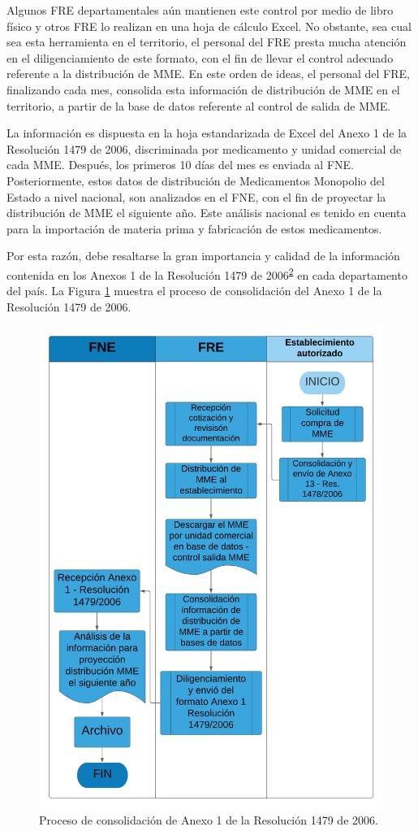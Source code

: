 \documentclass[
  oneside]{book}
\begin{document}
Algunos FRE departamentales aún mantienen este control por medio de libro físico y otros FRE lo realizan en una hoja de cálculo Excel. No obstante, sea cual sea esta herramienta en el territorio, el personal del FRE presta mucha atención en el diligenciamiento de este formato, con el fin de llevar el control adecuado referente a la distribución de MME. En este orden de ideas, el personal del FRE, finalizando cada mes, consolida esta información de distribución de MME en el territorio, a partir de la base de datos referente al control de salida de MME.

La información es dispuesta en la hoja estandarizada de Excel del Anexo 1 de la Resolución 1479 de 2006, discriminada por medicamento y unidad comercial de cada MME. Después, los primeros 10 días del mes es enviada al FNE. Posteriormente, estos datos de distribución de Medicamentos Monopolio del Estado a nivel nacional, son analizados en el FNE, con el fin de proyectar la distribución de MME el siguiente año. Este análisis nacional es tenido en cuenta para la importación de materia prima y fabricación de estos medicamentos.

Por esta razón, debe resaltarse la gran importancia y calidad de la información contenida en los Anexos 1 de la Resolución 1479 de 2006\textsuperscript{\protect\hyperlink{ref-MSPS1479-2006}{2}} en cada departamento del país. La Figura \ref{fig:procesoA1-1479} muestra el proceso de consolidación del Anexo 1 de la Resolución 1479 de 2006.

\begin{figure}

{\centering \includegraphics[width=0.8\linewidth]{figures/Consolidacion_A1_Res_1479_2006} 

}

\caption{Proceso de consolidación de Anexo 1 de la Resolución 1479 de 2006.}\label{fig:procesoA1-1479}
\end{figure}
\end{document}
